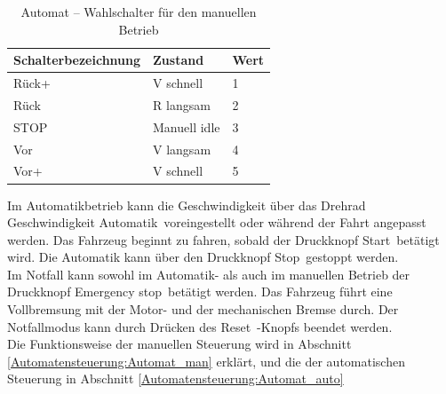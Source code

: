 \pagebreak[1]
\begin{table}[!ht]
	\centering
	\caption{Automat – Wahlschalter für den manuellen Betrieb}
	\label{Controllpanel:tab:Wahlschalter}
	\begin{tabular}{cll}
		\hline
		\textbf{Schalterbezeichnung} & \textbf{Zustand} & \textbf{Wert} \\ \hline
		\multicolumn{1}{l|}{Rück+}   & V schnell        & 1             \\
		\multicolumn{1}{l|}{Rück}    & R langsam        & 2             \\
		\multicolumn{1}{l|}{STOP}    & Manuell idle     & 3             \\
		\multicolumn{1}{l|}{Vor}     & V langsam        & 4             \\
		\multicolumn{1}{l|}{Vor+}    & V schnell        & 5             \\ \hline
	\end{tabular}
\end{table}
\pagebreak[3]
Im Automatikbetrieb kann die Geschwindigkeit über das Drehrad \frqq Geschwindigkeit Automatik\flqq\ voreingestellt oder während der Fahrt angepasst werden. Das Fahrzeug beginnt zu fahren, sobald der Druckknopf \frqq Start\flqq\ betätigt wird. Die Automatik kann über den Druckknopf \frqq Stop\flqq\ gestoppt werden.\\ Im Notfall kann sowohl im Automatik- als auch im manuellen Betrieb der Druckknopf \frqq Emergency stop\flqq\ betätigt werden. Das Fahrzeug führt eine Vollbremsung mit der Motor- und der mechanischen Bremse durch. Der Notfallmodus kann durch Drücken des \frqq Reset\flqq\ -Knopfs beendet werden.\\
Die Funktionsweise der manuellen Steuerung wird in Abschnitt \ref{Automatensteuerung:Automat_man} erklärt, und die der automatischen Steuerung in Abschnitt \ref{Automatensteuerung:Automat_auto}


